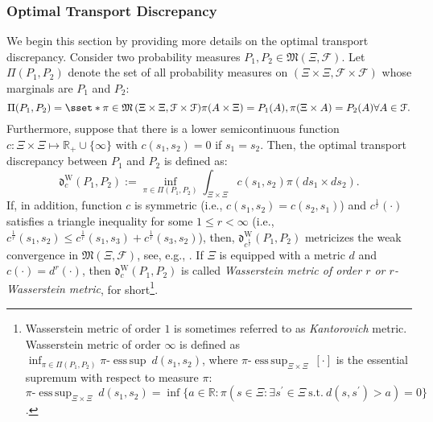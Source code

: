\documentclass[final,onefignum,onetabnum]{class}
\DeclareMathOperator*{\esssup}{ess\,sup}
\newcommand{\bs}[1]{\boldsymbol{#1}} %
\newcommand{\Bs}[1]{\mathbb{#1}} %
\newcommand{\Cs}[1]{\mathcal{#1}} %
\newcommand{\Fs}[1]{\mathfrak{#1}} %
\newcommand{\measurespace}{\left( \Xi, \Cs{F} \right)}
\newcommand{\promeasurespace}{\left( \Xi \times \Xi, \Cs{F} \times \Cs{F} \right)}
\newcommand{\st}{\text{s.t.}}
\begin{document}
\subsubsection{Optimal Transport Discrepancy}



We begin this section by providing more details on the optimal transport discrepancy.
Consider two probability measures $P_{1},  P_{2} \in \Fs{M}\measurespace$. Let $\Pi(P_{1},  P_{2})$ denote the set of all probability measures on $\promeasurespace$ whose marginals are $P_{1}$ and $P_{2}$: 
\begin{equation*}
    \Pi(P_{1},  P_{2})=\sset*{ \pi \in\Fs{M}\promeasurespace}{ \pi(A\times\Xi) = P_{1}(A),  \pi(\Xi\times A) = P_{2}(A)  \forall A\in\Cs{F} }. 
\end{equation*}
Furthermore, suppose that  there is a lower semicontinuous function $c: \Xi \times \Xi \mapsto \Bs{R}_{+} \cup\{\infty\}$ with $c(s_{1},s_{2})=0$ if $s_{1}=s_{2}$.  
Then, the optimal transport discrepancy between  $P_{1}$ and $P_{2}$ is defined as:
\begin{equation} 
\label{eq: rev.opt_transport}
\Fs{d}^{\text{W}}_{c}(P_{1},  P_{2}):= %
\inf_{\pi\in \Pi(P_{1},  P_{2})}  \int_{\Xi\times \Xi} c(s_1,s_2) \pi(d s_1\times d s_2). %
\end{equation}
If, in addition, %
function $c$  is symmetric (i.e., $c(s_{1},s_{2})=c(s_{2},s_{1})$) and $c^{\frac{1}{r}}(\cdot)$ satisfies a triangle inequality for some $1 \le r < \infty$ (i.e.,  $c^{\frac{1}{r}}(s_{1},s_{2}) \le c^{\frac{1}{r}}(s_{1},s_{3}) + c^{\frac{1}{r}}(s_{3},s_{2})$), then, $\Fs{d}^{\text{W}}_{c^{{\frac{1}{r}}}}(P_{1},  P_{2})$  metricizes the weak convergence in  $\Fs{M}\measurespace$, see, e.g., \citet[Theorem~6.9]{villani2008}. If $\Xi$ is equipped with a metric $d$ and $c(\cdot)=d^{r}(\cdot)$, then $ \Fs{d}^{\text{W}}_{c}(P_{1},  P_{2})$ is called {\it Wasserstein metric of order $r$ or $r$-Wasserstein metric}, for short\footnote{Wasserstein metric of order $1$ is sometimes referred to as {\it Kantorovich} metric. Wasserstein metric of order $\infty$ is defined as $\inf_{\pi\in  \Pi(P_{1},P_{2})} \pi\textrm{-}\esssup \  d(s_{1},s_{2})$, where $\pi\textrm{-}\esssup_{\Xi \times \Xi} \ [\cdot]$ is the essential supremum with respect to measure $\pi$: $\pi\textrm{-}\esssup_{\Xi \times \Xi} \ d(s_{1},s_{2})=\inf\{a \in \Bs{R}: \pi(s \in \Xi: \exists s^{\prime} \in \Xi \ \st \  d(s,s^{\prime})>a)=0\}$.}. 
\end{document}
